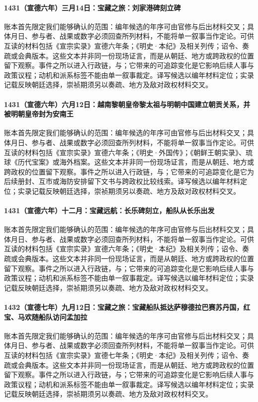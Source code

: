 \paragraph{1431（宣德六年）三月14日：宝藏之旅：刘家港碑刻立碑} 账本首先限定我们能够确认的范围：编年候选的年序可由官修与后出材料交叉；具体月日、参与者、战果或数字必须回查所列材料，不能将单一叙事当作定论。可供互读的材料包括《宣宗实录》宣德六年条；《明史·本纪》及相关列传；诏令、奏疏或会典版本。这些文本并非同一份现场证言，而是从朝廷、地方或跨政权的位置留下观察。事件之所以进入行政链，与；它带来的可追踪变化是它影响后续人事与政策议程；动机和派系标签不能由单一叙事裁定。译写候选以编年材料定位；实录记载反映朝廷选择，崇祯期须另以奏疏、地方及敌对政权材料交叉。

\paragraph{1431（宣德六年）六月12日：越南黎朝皇帝黎太祖与明朝中国建立朝贡关系，并被明朝皇帝封为安南王} 账本首先限定我们能够确认的范围：编年候选的年序可由官修与后出材料交叉；具体月日、参与者、战果或数字必须回查所列材料，不能将单一叙事当作定论。可供互读的材料包括《宣宗实录》宣德六年条；《明史·外国传》；《朝鲜王朝实录》、琉球《历代宝案》或海外档案。这些文本并非同一份现场证言，而是从朝廷、地方或跨政权的位置留下观察。事件之所以进入行政链，与；它带来的可追踪变化是它为后续册封、互市或海防安排留下文书与跨政权比较线索。译写候选以编年材料定位；实录记载反映朝廷选择，崇祯期须另以奏疏、地方及敌对政权材料交叉。

\paragraph{1431（宣德六年）十二月：宝藏远航：长乐碑刻立，船队从长乐出发} 账本首先限定我们能够确认的范围：编年候选的年序可由官修与后出材料交叉；具体月日、参与者、战果或数字必须回查所列材料，不能将单一叙事当作定论。可供互读的材料包括《宣宗实录》宣德六年条；《明史·本纪》及相关列传；诏令、奏疏或会典版本。这些文本并非同一份现场证言，而是从朝廷、地方或跨政权的位置留下观察。事件之所以进入行政链，与；它带来的可追踪变化是它影响后续人事与政策议程；动机和派系标签不能由单一叙事裁定。译写候选以编年材料定位；实录记载反映朝廷选择，崇祯期须另以奏疏、地方及敌对政权材料交叉。

\paragraph{1432（宣德七年）九月12日：宝藏之旅：宝藏船队抵达萨穆德拉巴赛苏丹国，红宝、马欢随船队访问孟加拉} 账本首先限定我们能够确认的范围：编年候选的年序可由官修与后出材料交叉；具体月日、参与者、战果或数字必须回查所列材料，不能将单一叙事当作定论。可供互读的材料包括《宣宗实录》宣德七年条；《明史·本纪》及相关列传；诏令、奏疏或会典版本。这些文本并非同一份现场证言，而是从朝廷、地方或跨政权的位置留下观察。事件之所以进入行政链，与；它带来的可追踪变化是它影响后续人事与政策议程；动机和派系标签不能由单一叙事裁定。译写候选以编年材料定位；实录记载反映朝廷选择，崇祯期须另以奏疏、地方及敌对政权材料交叉。
